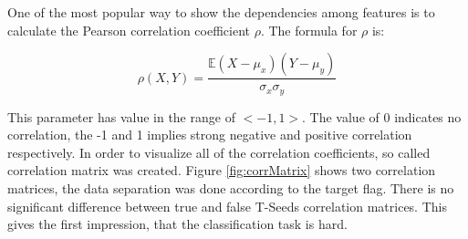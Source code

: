 One of the most popular way to show the dependencies among features is to calculate  the Pearson correlation coefficient $\rho$. The formula for $\rho$ is:

\begin{equation}
    \rho(X,Y) = \frac{\mathbb{E}(X-\mu_x)(Y-\mu_y)}{\sigma_x \sigma_y}
\end{equation}

This parameter has value in the range of $<-1,1>$. The value of 0 indicates no correlation, the -1 and 1 implies strong negative and positive correlation respectively. In order to visualize all of the correlation coefficients, so called correlation matrix was created. Figure \ref{fig:corrMatrix} shows two correlation matrices, the data separation was done according to the target flag. There is no significant difference between true and false T-Seeds correlation matrices. This gives the first impression, that the classification task is hard. 

